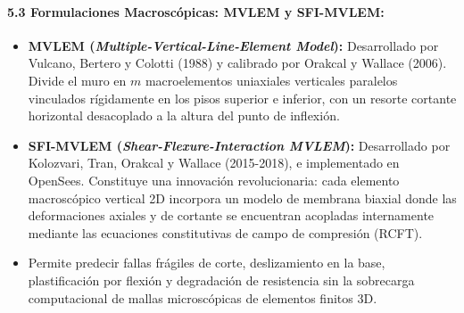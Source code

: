 \documentclass[11pt,letterpaper]{article}
\begin{document}
\begin{modulebox}
\paragraph{5.3 Formulaciones Macroscópicas: MVLEM y SFI-MVLEM:}
\begin{itemize}
    \item \textbf{MVLEM (\textit{Multiple-Vertical-Line-Element Model}):} Desarrollado por Vulcano, Bertero y Colotti (1988) y calibrado por Orakcal y Wallace (2006). Divide el muro en $m$ macroelementos uniaxiales verticales paralelos vinculados rígidamente en los pisos superior e inferior, con un resorte cortante horizontal desacoplado a la altura del punto de inflexión.
    \item \textbf{SFI-MVLEM (\textit{Shear-Flexure-Interaction MVLEM}):} Desarrollado por Kolozvari, Tran, Orakcal y Wallace (2015-2018), e implementado en OpenSees. Constituye una innovación revolucionaria: cada elemento macroscópico vertical 2D incorpora un modelo de membrana biaxial donde las deformaciones axiales y de cortante se encuentran acopladas internamente mediante las ecuaciones constitutivas de campo de compresión (RCFT).
    \item Permite predecir fallas frágiles de corte, deslizamiento en la base, plastificación por flexión y degradación de resistencia sin la sobrecarga computacional de mallas microscópicas de elementos finitos 3D.
\end{itemize}
\end{modulebox}
\end{document}
